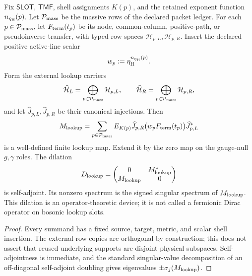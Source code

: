 \documentclass[12pt,a4paper]{article}
\newcommand{\etaH}{\eta_{\rm H}}
\begin{document}
\begin{theorem}
\label{p6:thm:conditional-terminal-operator}
Fix \(\mathsf{SLOT}\), \(\mathsf{TMF}\), shell assignments \(K(p)\), and
the retained exponent function \(n_{\etaH}(p)\).  Let
\(\mathcal P_{\rm mass}\) be the
massive rows of the declared packet ledger.  For each
\(p\in\mathcal P_{\rm mass}\), let \(F_{\rm term}(t_p)\) be its node,
common-column, positive-path, or pseudoinverse transfer, with typed row
spaces \(\mathcal H_{p,L},\mathcal H_{p,R}\).  Insert the declared positive
active-line scalar
\[
w_p:=\etaH^{n_{\etaH}(p)}.
\]
Form the external lookup
carriers
\[
\widehat{\mathcal H}_L
=
\bigoplus_{p\in\mathcal P_{\rm mass}}\mathcal H_{p,L},
\qquad
\widehat{\mathcal H}_R
=
\bigoplus_{p\in\mathcal P_{\rm mass}}\mathcal H_{p,R},
\]
and let \(\widehat J_{p,L},\widehat J_{p,R}\) be their canonical injections.
Then
\[
M_{\rm lookup}
=
\sum_{p\in\mathcal P_{\rm mass}}
E_{K(p)}\widehat J_{p,R}
\bigl(w_pF_{\rm term}(t_p)\bigr)\widehat J_{p,L}^*
\]
is a well-defined finite lookup map.  Extend it by the zero map on the
gauge-null \(g,\gamma\) roles.  The dilation
\[
D_{\rm lookup}
=
\begin{pmatrix}
0&M_{\rm lookup}^*\\
M_{\rm lookup}&0
\end{pmatrix}
\]
is self-adjoint.  Its nonzero spectrum is the signed singular spectrum of
\(M_{\rm lookup}\).  This dilation is an operator-theoretic device; it is not
called a fermionic Dirac operator on bosonic lookup slots.
\end{theorem}

\begin{proof}
Every summand has a fixed source, target, metric, and scalar shell insertion.
The external row copies are orthogonal by construction; this does not assert
that reused underlying supports are disjoint physical subspaces.
Self-adjointness is immediate, and the standard singular-value decomposition
of an off-diagonal self-adjoint doubling gives eigenvalues
\(\pm\sigma_j(M_{\rm lookup})\).
\end{proof}
\end{document}
